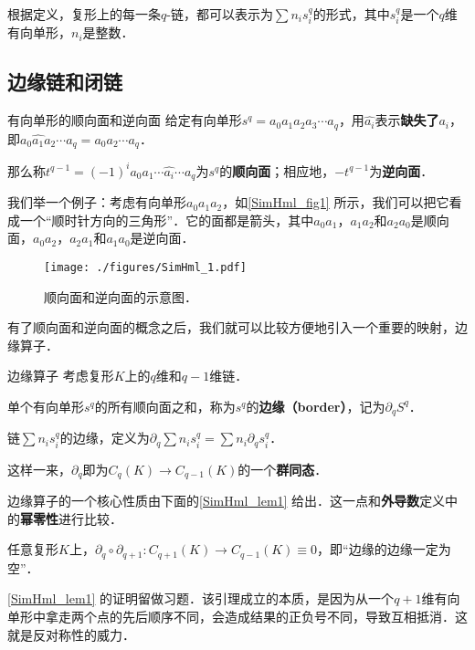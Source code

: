 根据定义，复形上的每一条$q$-链，都可以表示为$\sum n_is^q_i$的形式，其中$s^q_i$是一个$q$维有向单形，$n_i$是整数．

\subsection{边缘链和闭链}

\begin{definition}{有向单形的顺向面和逆向面}
给定有向单形$s^q=a_0a_1a_2a_3\cdots a_q$，用$\hat{a_i}$表示\textbf{缺失了}$a_i$，即$a_0\hat{a_1}a_2\cdots a_q=a_0a_2\cdots a_q$．

那么称$t^{q-1}=(-1)^ia_0a_1\cdots\hat{a_i}\cdots a_q$为$s^q$的\textbf{顺向面}；相应地，$-t^{q-1}$为\textbf{逆向面}．
\end{definition}

我们举一个例子：考虑有向单形$a_0a_1a_2$，如\autoref{SimHml_fig1} 所示，我们可以把它看成一个“顺时针方向的三角形”．它的面都是箭头，其中$a_0a_1$，$a_1a_2$和$a_2a_0$是顺向面，$a_0a_2$，$a_2a_1$和$a_1a_0$是逆向面．

\begin{figure}[ht]
\centering
\texttt{[image: ./figures/SimHml\_1.pdf]}
\caption{顺向面和逆向面的示意图．} \label{SimHml_fig1}
\end{figure}

有了顺向面和逆向面的概念之后，我们就可以比较方便地引入一个重要的映射，边缘算子．

\begin{definition}{边缘算子}
考虑复形$K$上的$q$维和$q-1$维链．

单个有向单形$s^q$的所有顺向面之和，称为$s^q$的\textbf{边缘（border）}，记为$\partial_q S^q$．

链$\sum n_is^q_i$的边缘，定义为$\partial_q \sum n_is^q_i=\sum n_i\partial_qs^q_i$．

这样一来，$\partial_q$即为$C_q(K)\to C_{q-1}(K)$的一个\textbf{群同态}．
\end{definition}

边缘算子的一个核心性质由下面的\autoref{SimHml_lem1} 给出．这一点和\textbf{外导数}定义中的\textbf{幂零性}进行比较．

\begin{lemma}{}\label{SimHml_lem1}
任意复形$K$上，$\partial_q\circ\partial_{q+1}:C_{q+1}(K)\to C_{q-1}(K)\equiv 0$，即“边缘的边缘一定为空”．
\end{lemma}

\autoref{SimHml_lem1} 的证明留做习题．该引理成立的本质，是因为从一个$q+1$维有向单形中拿走两个点的先后顺序不同，会造成结果的正负号不同，导致互相抵消．这就是反对称性的威力．


